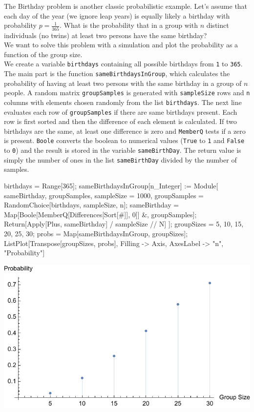 \documentclass{tstextbook}
\begin{document}
\begin{example}
The Birthday problem is another classic probabilistic example. Let's assume that each day of the year (we ignore leap years) is equally likely a birthday with probability $p=\frac{1}{365}$. What is the probability that in a group with $n$ distinct individuals (no twins) at least two persons have the same birthday?\\

We want to solve this problem with a simulation and plot the probability as a function of the group size. \\

We create a variable \texttt{birthdays} containing all possible birthdays from \texttt{1} to \texttt{365}.
The main part is the function \texttt{sameBirthdaysInGroup}, which calculates the probability of having at least two persons with the same birthday in a group of $n$ people. A random matrix \texttt{groupSamples} is generated with \texttt{sampleSize} rows and \texttt{n} columns with elements chosen randomly from the list \texttt{birthdays}. The next line evaluates each row of \texttt{groupSamples} if there are same birthdays present. Each row is first sorted and then the difference of each element is calculated. If two birthdays are the same, at least one difference is zero and
\texttt{MemberQ} tests if a zero is present. \texttt{Boole} converts the boolean to numerical values (\texttt{True} to \texttt{1} and \texttt{False} to \texttt{0}) and the result is stored in the variable \texttt{sameBirthDay}. The return value is simply the number of ones in the list \texttt{sameBirthDay} divided by the number of samples.\\ 

\begin{mathematica}
birthdays = Range[365];
sameBirthdaysInGroup[n_Integer] := Module[
   {sameBirthday, groupSamples, sampleSize = 1000},
   groupSamples = RandomChoice[birthdays, {sampleSize, n}];
   sameBirthday = Map[Boole[MemberQ[Differences[Sort[#]], 0]] &, groupSamples];
   Return[Apply[Plus, sameBirthday] / sampleSize // N]
   ];
groupSizes = {5, 10, 15, 20, 25, 30};
probs = Map[sameBirthdaysInGroup, groupSizes];
ListPlot[Transpose[{groupSizes, probs}],
         Filling -> Axis, 
         AxesLabel -> {"n", "Probability"}]
\end{mathematica}

 \includegraphics{images/double_birthday_problem.pdf}
 

\end{example}
\end{document}
